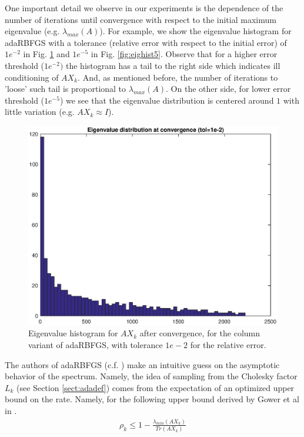 \documentclass[12pt,conference,compsocconf]{IEEEtran}
\begin{document}
One important detail we observe in our experiments is the dependence of the number of iterations until convergence with respect to the initial maximum eigenvalue (e.g. $\lambda_{max}(A)$). For example, we show the eigenvalue histogram for adaRBFGS with a tolerance (relative error with respect to the initial error) of $1e^{-2}$ in Fig. \ref{fig:eighist2} and $1e^{-5}$ in Fig. \ref{fig:eighist5}. Observe that for a higher error threshold ($1e^{-2})$ the histogram has a tail to the right side which indicates ill conditioning of $AX_k$. And, as mentioned before, the number of iterations to 'loose' such tail is proportional to $\lambda_{max}(A)$. On the other side, for lower error threshold ($1e^{-5}$) we see that the eigenvalue distribution is centered around $1$ with little variation (e.g. $AX_k \approx I$).
\begin{figure}
  \centering
  \includegraphics[height=0.7\columnwidth,width=1.0\columnwidth]{eigdisttol2.eps}
  
  \vspace{-2mm}
  \caption{Eigenvalue histogram for $AX_k$ after convergence, for the column variant of adaRBFGS, with tolerance $1e-2$ for the relative error. \label{fig:eighist2}}  
  
\end{figure}
The authors of adaRBFGS (c.f. \cite{Gower1}) make an intuitive guess on the asymptotic behavior of the spectrum. Namely, the idea of sampling from the Cholesky factor $L_k$ (see Section \ref{sect:adadef}) comes from the expectation of an optimized upper bound on the rate. Namely, for the following upper bound derived by Gower et al in \cite{Gower2}. 
\begin{align} \label{eq:upperbtrada}
	\rho_k \leq 1- \frac{\lambda_{min}(AX_k)}{Tr(AX_k)}
\end{align}
\end{document}
